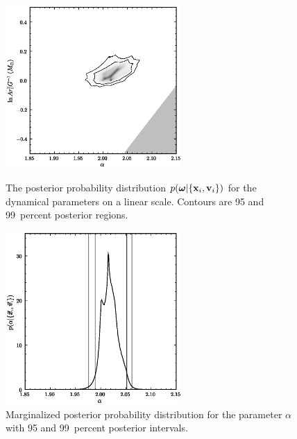 \clearpage
\begin{figure}
\includegraphics[width=0.6\textwidth]{figs_solarsystem/murrayRoulette.ps}\\%
\caption[The posterior probability distribution $p(\mvomega|\setofxv)$
  for the dynamical parameters]{The posterior probability distribution
  $p(\mvomega|\setofxv)$ for the dynamical parameters on a linear
  scale. Contours are 95 and 99~percent posterior
  regions.}\label{fig:Bayes2d}
\end{figure}

\clearpage
\begin{figure}
\includegraphics[width=0.6\textwidth]{figs_solarsystem/murrayRouletteAlpha.ps}
\caption{Marginalized posterior probability distribution for the
parameter $\alpha$ with 95 and 99~percent posterior
intervals.}\label{fig:Bayes1d}
\end{figure}

